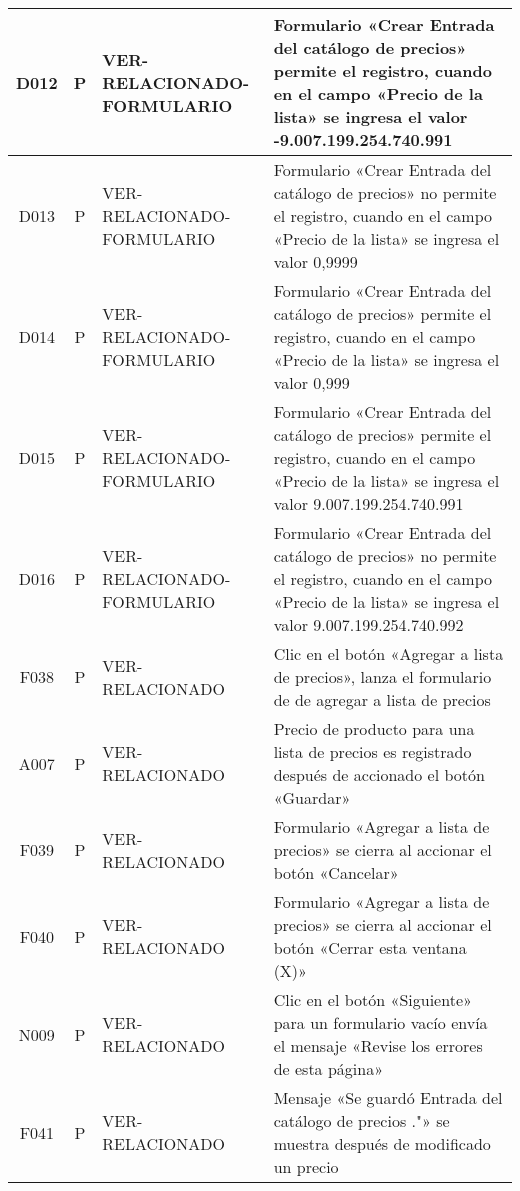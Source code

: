 \begin{landscape}
{\begin{longtable}[htb]{|c|c|p{3.8cm}|p{15.2cm}|}
\scriptsize{D012} & \scriptsize{P} & \scriptsize{VER-RELACIONADO-FORMULARIO} & \scriptsize{Formulario «Crear Entrada del catálogo de precios» permite el registro, cuando en el campo «Precio de la lista» se ingresa el valor -9.007.199.254.740.991} \\ \hline
\scriptsize{D013} & \scriptsize{P} & \scriptsize{VER-RELACIONADO-FORMULARIO} & \scriptsize{Formulario «Crear Entrada del catálogo de precios» no permite el registro, cuando en el campo «Precio de la lista» se ingresa el valor 0,9999} \\ \hline
\scriptsize{D014} & \scriptsize{P} & \scriptsize{VER-RELACIONADO-FORMULARIO} & \scriptsize{Formulario «Crear Entrada del catálogo de precios» permite el registro, cuando en el campo «Precio de la lista» se ingresa el valor 0,999} \\ \hline
\scriptsize{D015} & \scriptsize{P} & \scriptsize{VER-RELACIONADO-FORMULARIO} & \scriptsize{Formulario «Crear Entrada del catálogo de precios» permite el registro, cuando en el campo «Precio de la lista» se ingresa el valor 9.007.199.254.740.991} \\ \hline
\scriptsize{D016} & \scriptsize{P} & \scriptsize{VER-RELACIONADO-FORMULARIO} & \scriptsize{Formulario «Crear Entrada del catálogo de precios» no permite el registro, cuando en el campo «Precio de la lista» se ingresa el valor 9.007.199.254.740.992} \\ \hline
\scriptsize{F038} & \scriptsize{P} & \scriptsize{VER-RELACIONADO} & \scriptsize{Clic en el botón «Agregar a lista de precios», lanza el formulario de de agregar a lista de precios} \\ \hline
\scriptsize{A007} & \scriptsize{P} & \scriptsize{VER-RELACIONADO} & \scriptsize{Precio de producto para una lista de precios es registrado después de accionado el botón «Guardar»} \\ \hline
\scriptsize{F039} & \scriptsize{P} & \scriptsize{VER-RELACIONADO} & \scriptsize{Formulario «Agregar a lista de precios» se cierra al accionar el botón «Cancelar»} \\ \hline
\scriptsize{F040} & \scriptsize{P} & \scriptsize{VER-RELACIONADO} & \scriptsize{Formulario «Agregar a lista de precios» se cierra al accionar el botón «Cerrar esta ventana (X)»} \\ \hline
\scriptsize{N009} & \scriptsize{P} & \scriptsize{VER-RELACIONADO} & \scriptsize{Clic en el botón «Siguiente» para un formulario vacío envía el mensaje «Revise los errores de esta página»} \\ \hline
\scriptsize{F041} & \scriptsize{P} & \scriptsize{VER-RELACIONADO} & \scriptsize{Mensaje «Se guardó Entrada del catálogo de precios ."» se muestra después de modificado un precio} \\ \hline

\end{longtable}}
\end{landscape}
